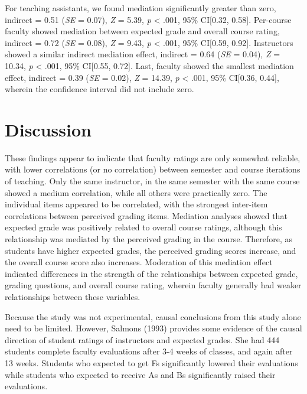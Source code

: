 \documentclass[man]{apa6}
\theoremstyle{definition}
\theoremstyle{definition}
\theoremstyle{definition}
\theoremstyle{remark}
\begin{document}
For teaching assistants, we found mediation significantly greater than
zero, indirect = 0.51 (\emph{SE} = 0.07), \emph{Z} = 5.39, \emph{p}
\textless{} .001, 95\% CI{[}0.32, 0.58{]}. Per-course faculty showed
mediation between expected grade and overall course rating, indirect =
0.72 (\emph{SE} = 0.08), \emph{Z} = 9.43, \emph{p} \textless{} .001,
95\% CI{[}0.59, 0.92{]}. Instructors showed a similar indirect mediation
effect, indirect = 0.64 (\emph{SE} = 0.04), \emph{Z} = 10.34, \emph{p}
\textless{} .001, 95\% CI{[}0.55, 0.72{]}. Last, faculty showed the
smallest mediation effect, indirect = 0.39 (\emph{SE} = 0.02), \emph{Z}
= 14.39, \emph{p} \textless{} .001, 95\% CI{[}0.36, 0.44{]}, wherein the
confidence interval did not include zero.

\section{Discussion}\label{discussion}

These findings appear to indicate that faculty ratings are only somewhat
reliable, with lower correlations (or no correlation) between semester
and course iterations of teaching. Only the same instructor, in the same
semester with the same course showed a medium correlation, while all
others were practically zero. The individual items appeared to be
correlated, with the strongest inter-item correlations between perceived
grading items. Mediation analyses showed that expected grade was
positively related to overall course ratings, although this relationship
was mediated by the perceived grading in the course. Therefore, as
students have higher expected grades, the perceived grading scores
increase, and the overall course score also increases. Moderation of
this mediation effect indicated differences in the strength of the
relationships between expected grade, grading questions, and overall
course rating, wherein faculty generally had weaker relationships
between these variables.

Because the study was not experimental, causal conclusions from this
study alone need to be limited. However, Salmons (1993) provides some
evidence of the causal direction of student ratings of instructors and
expected grades. She had 444 students complete faculty evaluations after
3-4 weeks of classes, and again after 13 weeks. Students who expected to
get Fs significantly lowered their evaluations while students who
expected to receive As and Bs significantly raised their evaluations.
\end{document}
